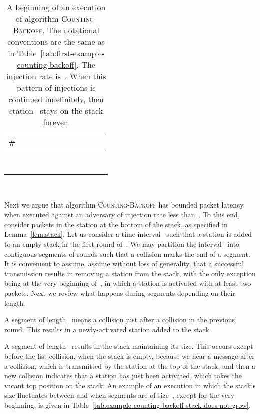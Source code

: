 \documentclass[11pt]{article}
\newlength{\pagewidth}
\newcommand{\RB}{\raisebox{2.5ex}{~}}
\newcommand{\LB}{\raisebox{-1.5ex}{~}}
\begin{document}
\begin{table}[t]
\begin{center}
\begin{tabular}{| c ||c |c |c |c |c | c | c | c | c | c | c |  }
\hline
\RB \LB
\# &  &  &  &&&  & & &  &  &   \\
\hline\hline
\RB \LB
&   &  &  & & && & &  &&\\
\hline
\RB \LB
 & &  &  && & & &&&&\\
\hline
\RB \LB
 & & &   & & & &&& &&\\
\hline
\RB \LB
 & & &&  & &&&& &&\\
\hline
\RB \LB
 & & &&& &&&& &&\\
\hline
\RB \LB
 & & &&  & &&&& &&\\
\hline
\RB \LB
 & & &&  & &&&& &&\\
\hline
\RB \LB
 & & &&  & &&&  & &&\\
\hline
\end{tabular}
\parbox{\pagewidth}{
~
\caption{\label{tab:example-counting-backoff-lack-fairness}
A beginning of an execution of algorithm \textsc{Counting-Backoff}.
The notational conventions are the same as in Table~\ref{tab:first-example-counting-backoff}.
The injection rate is~.
When this pattern of injections is continued indefinitely, then station~ stays on the stack forever.
}}
\end{center}
\end{table}


Next we argue that algorithm \textsc{Counting-Backoff} has bounded packet latency when executed against an  adversary of  injection rate less than~.
To this end, consider packets in the station at the bottom of the stack, as specified in Lemma~\ref{lem:stack}.
Let us consider a time interval~ such that a station is added to an empty stack in the first round of~.
We may partition the interval~ into contiguous segments of rounds such that a collision marks  the end of a segment.
It is convenient to assume, assume without loss of generality, that a successful transmission results in removing a station from the stack, with the only exception being at the very beginning of~, in which a station is activated with at least two packets.
Next we review what happens during segments depending on their length.

A segment of length~  means a collision just after a collision in the previous round.
This results in a newly-activated station added to the stack.

A segment of length~ results in the stack maintaining its size.
This occurs except before the fist collision, when the stack is empty, because we hear a message after a collision, which is transmitted by the station at the top of the stack, and then a new collision indicates that a station has just been activated, which takes the vacant top position on the stack.
An example of an execution in which the stack's size fluctuates between  and  when segments are of size~, except for the very beginning, is given in Table~\ref{tab:example-counting-backoff-stack-does-not-grow}.
\end{document}
